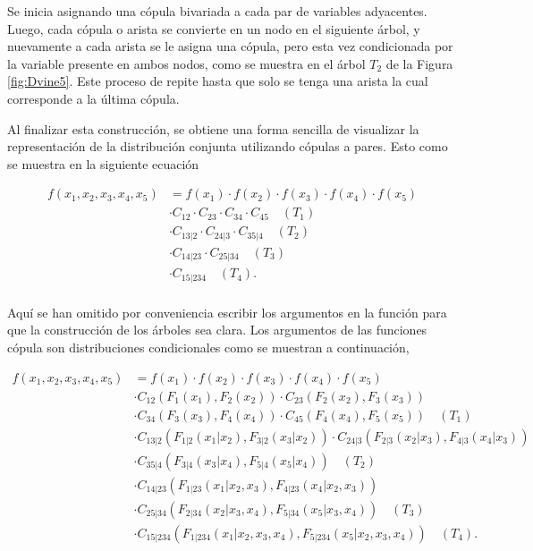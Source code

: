 Se inicia asignando una cópula bivariada a cada par de variables adyacentes. Luego, cada cópula o arista se convierte en un nodo en el siguiente árbol, y nuevamente a cada arista se le asigna una cópula, pero esta vez condicionada por la variable presente en ambos nodos, como se muestra en el árbol $T_2$ de la Figura \ref{fig:Dvine5}. Este proceso de repite hasta que solo se tenga una arista la cual corresponde a la última cópula. 


Al finalizar esta construcción, se obtiene una forma sencilla de visualizar la representación de la distribución conjunta utilizando cópulas a pares. Esto como se muestra en la siguiente ecuación

\begin{equation}\label{dist5}
     \begin{split}
         f(x_1, x_2, x_3, x_4, x_5) & = f(x_1) \cdot f(x_2) \cdot f(x_3) \cdot f(x_4) \cdot f(x_5)  \\
         & \cdot C_{12} \cdot C_{23} \cdot C_{34} \cdot C_{45} \quad (T_1)\\
         & \cdot C_{13|2} \cdot C_{24|3} \cdot C_{35|4} \quad (T_2)\\\
         & \cdot C_{14|23} \cdot C_{25|34} \quad (T_3)\\
         & \cdot C_{15|234} \quad (T_4). \\
     \end{split}
\end{equation}

Aquí se han omitido por conveniencia escribir los argumentos en la función para que la construcción de los árboles sea clara. Los argumentos de las funciones cópula son distribuciones condicionales como se muestran a continuación, 

\begin{equation}\label{distC5}
     \begin{split}
         f(x_1, x_2, x_3, x_4, x_5) & = f(x_1) \cdot f(x_2) \cdot f(x_3) \cdot f(x_4) \cdot f(x_5)  \\
         & \cdot C_{12}(F_1(x_1), F_2(x_2)) \cdot C_{23}(F_2(x_2), F_3(x_3)) \\
         & \cdot C_{34}(F_3(x_3), F_4(x_4)) \cdot C_{45}(F_4(x_4), F_5(x_5)) \quad (T_1)\\
         & \cdot C_{13|2}(F_{1|2}(x_1|x_2), F_{3|2}(x_3|x_2)) \cdot C_{24|3}(F_{2|3}(x_2|x_3), F_{4|3}(x_4|x_3))\\
         &\cdot C_{35|4}(F_{3|4}(x_3|x_4), F_{5|4}(x_5|x_4)) \quad (T_2)\\
         & \cdot C_{14|23}(F_{1|23}(x_1|x_2, x_3), F_{4|23}(x_4|x_2, x_3)) \\
         & \cdot C_{25|34}(F_{2|34}(x_2|x_3, x_4), F_{5|34}(x_5|x_3, x_4)) \quad (T_3)\\
         & \cdot C_{15|234}(F_{1|234}(x_1|x_2, x_3, x_4), F_{5|234}(x_5|x_2, x_3, x_4)) \quad (T_4).\\
     \end{split}
\end{equation}

